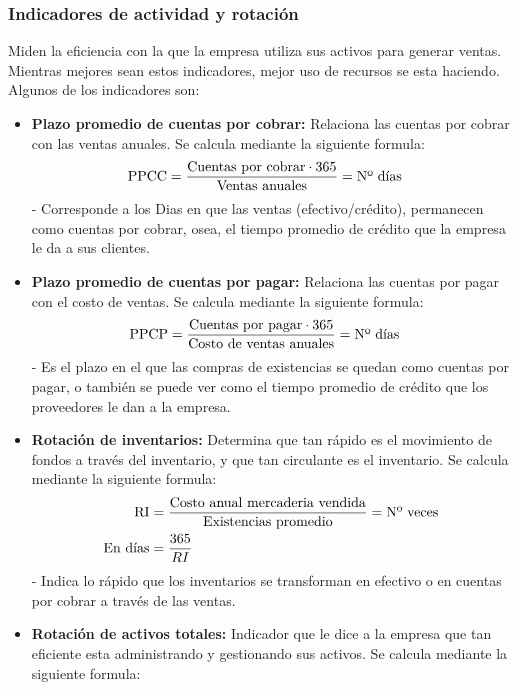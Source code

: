 \documentclass{templateNote}
\begin{document}
\subsubsection{Indicadores de actividad y rotación}
\noindent Miden la eficiencia con la que la empresa utiliza sus activos para generar ventas. Mientras mejores sean estos indicadores, mejor uso de recursos se esta haciendo. Algunos de los indicadores son:

\begin{itemize}
    \item \textbf{Plazo promedio de cuentas por cobrar: }Relaciona las cuentas por cobrar con las ventas anuales. Se calcula mediante la siguiente formula:
    \begin{align*}
        \textnormal{PPCC} &= \frac{\textnormal{Cuentas por cobrar} \cdot 365}{\textnormal{Ventas anuales}} = \textnormal{Nº días}
    \end{align*}
    - Corresponde a los Dias en que las ventas (efectivo/crédito), permanecen como cuentas por cobrar, osea, el tiempo promedio de crédito que la empresa le da a sus clientes.
    \item \textbf{Plazo promedio de cuentas por pagar: }Relaciona las cuentas por pagar con el costo de ventas. Se calcula mediante la siguiente formula:
    \begin{align*}
        \textnormal{PPCP} &= \frac{\textnormal{Cuentas por pagar} \cdot 365}{\textnormal{Costo de ventas anuales}} = \textnormal{Nº días}
    \end{align*}
    - Es el plazo en el que las compras de existencias se quedan como cuentas por pagar, o también se puede ver como el tiempo promedio de crédito que los proveedores le dan a la empresa.
    \item \textbf{Rotación de inventarios: }Determina que tan rápido es el movimiento de fondos a través del inventario, y que tan circulante es el inventario. Se calcula mediante la siguiente formula:
    \begin{align*}
        \textnormal{RI} &= \frac{\textnormal{Costo anual mercaderia vendida}}{\textnormal{Existencias promedio}} = \textnormal{Nº veces} \\
        \textnormal{En días} &= \frac{365}{RI}
    \end{align*}
    - Indica lo rápido que los inventarios se transforman en efectivo o en cuentas por cobrar a través de las ventas.
    \item \textbf{Rotación de activos totales:} Indicador que le dice a la empresa que tan eficiente esta administrando y gestionando sus activos. Se calcula mediante la siguiente formula:

\end{itemize}
\end{document}
